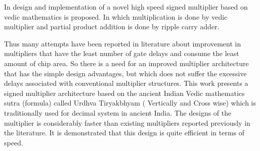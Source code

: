 In \cite{r5} design and implementation of a novel high speed signed multiplier based on vedic mathematics is proposed. In which multiplication is done by vedic multiplier and partial product addition is done by ripple carry adder.


%

Thus many attempts have been reported in literature about improvement in multipliers that have the least number of gate delays and consume the least amount of chip area. So there is a need for an improved multiplier architecture that has the simple design advantages, but which does not suffer the excessive delays associated with conventional multiplier structures. This work presents a signed multiplier architecture based on the ancient Indian Vedic mathematics \cite{r1} sutra (formula) called Urdhva Tiryakbhyam ( Vertically and Cross wise) which is traditionally used for decimal system in ancient India. The designs of the multiplier is considerably faster than existing multipliers reported previously in the literature. It is demonstrated that this design is quite efficient in terms of speed.

